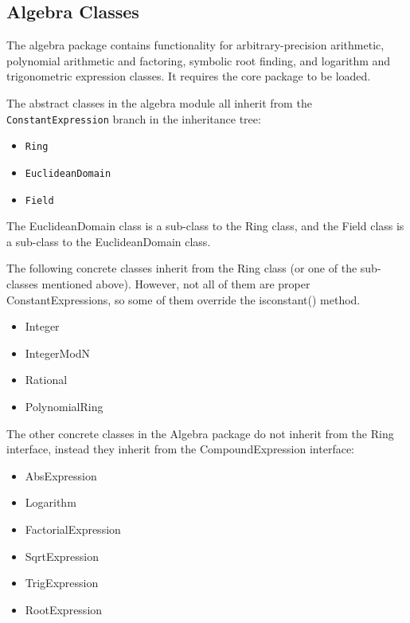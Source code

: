 \documentclass{article}
\begin{document}

\subsection{Algebra Classes}

The algebra package contains functionality for arbitrary-precision arithmetic, polynomial arithmetic and factoring, symbolic root finding, and logarithm and trigonometric expression classes. It requires the core package to be loaded.

The abstract classes in the algebra module all inherit from the \texttt{ConstantExpression} branch in the inheritance tree:

\begin{itemize}
    \item \texttt{Ring}
    \item \texttt{EuclideanDomain}
    \item \texttt{Field}
\end{itemize}

The {\ttfamily EuclideanDomain} class is a sub-class to the {\ttfamily Ring} class, and the {\ttfamily Field} class is a sub-class to the {\ttfamily EuclideanDomain} class.

The following concrete classes inherit from the {\ttfamily Ring} class (or one of the sub-classes mentioned above). However, not all of them are proper {\ttfamily ConstantExpression}s, so some of them override the {\ttfamily isconstant()} method.

\begin{itemize}
    \item {\ttfamily Integer}
    \item {\ttfamily IntegerModN}
    \item {\ttfamily Rational}
    \item {\ttfamily PolynomialRing}
\end{itemize}

The other concrete classes in the Algebra package do not inherit from the {\ttfamily Ring} interface, instead they inherit from the {\ttfamily CompoundExpression} interface:

\begin{itemize}
    \item {\ttfamily AbsExpression}
    \item {\ttfamily Logarithm}
    \item {\ttfamily FactorialExpression}
    \item {\ttfamily SqrtExpression}
    \item {\ttfamily TrigExpression}
    \item {\ttfamily RootExpression}
\end{itemize}
\end{document}
